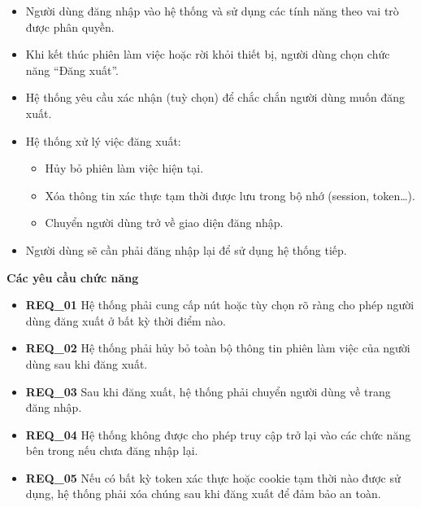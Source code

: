 \begin{itemize}

\item Người dùng đăng nhập vào hệ thống và sử dụng các tính năng theo vai trò được phân quyền.

\item Khi kết thúc phiên làm việc hoặc rời khỏi thiết bị, người dùng chọn chức năng “Đăng xuất”.

\item Hệ thống yêu cầu xác nhận (tuỳ chọn) để chắc chắn người dùng muốn đăng xuất.

\item Hệ thống xử lý việc đăng xuất:

    \begin{itemize}
        \item Hủy bỏ phiên làm việc hiện tại.
        \item Xóa thông tin xác thực tạm thời được lưu trong bộ nhớ (session, token…).
        \item Chuyển người dùng trở về giao diện đăng nhập.
    \end{itemize}
    
\item Người dùng sẽ cần phải đăng nhập lại để sử dụng hệ thống tiếp.

\end{itemize}

\noindent \textbf{Các yêu cầu chức năng}

\begin{itemize}

\item \textbf{REQ\_01} Hệ thống phải cung cấp nút hoặc tùy chọn rõ ràng cho phép người dùng đăng xuất ở bất kỳ thời điểm nào.

\item \textbf{REQ\_02} Hệ thống phải hủy bỏ toàn bộ thông tin phiên làm việc của người dùng sau khi đăng xuất.

\item \textbf{REQ\_03} Sau khi đăng xuất, hệ thống phải chuyển người dùng về trang đăng nhập.

\item \textbf{REQ\_04} Hệ thống không được cho phép truy cập trở lại vào các chức năng bên trong nếu chưa đăng nhập lại.

\item \textbf{REQ\_05} Nếu có bất kỳ token xác thực hoặc cookie tạm thời nào được sử dụng, hệ thống phải xóa chúng sau khi đăng xuất để đảm bảo an toàn.

\end{itemize}

